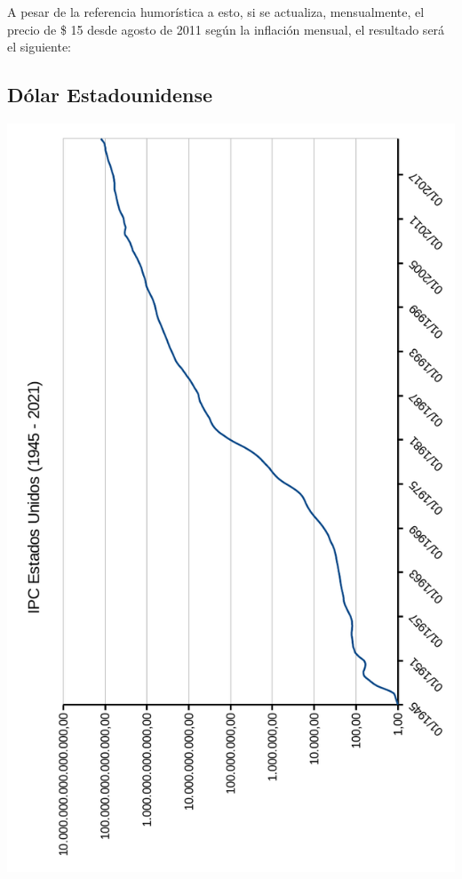 \documentclass[12pt,a4paper,twoside]{book}
\begin{document}
A pesar de la referencia humorística a esto, si se actualiza, mensualmente, el precio de  \$ 15 desde agosto de 2011 según la inflación mensual, el resultado será el siguiente:


\newpage

\subsection{Dólar Estadounidense}

\newpage

\begin{center}
\includegraphics[scale=0.975]{img/ipc-historico-usa.pdf}
\end{center}
\newpage
\end{document}

